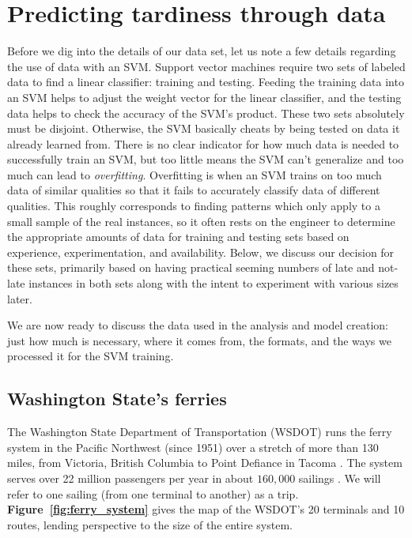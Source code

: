 \documentclass[11pt]{article} %
\begin{document}
\section{Predicting tardiness through data}
\label{sec:problem}
Before we dig into the details of our data set, let us note a few details regarding
the use of data with an SVM.  Support vector machines require two sets of labeled 
data to find a linear classifier:
training and testing. Feeding the training data into an SVM helps to adjust 
the weight vector for the linear classifier, and the testing data helps 
to check the accuracy of the SVM's product.  These two sets absolutely must 
be disjoint. Otherwise, the SVM basically cheats by being
tested on data it already learned from. There is no clear indicator for how much data
is needed to successfully train an SVM, but too little means the SVM can't 
generalize and too much can lead to \textit{overfitting}. Overfitting is when an 
SVM trains on too much data of similar qualities so that it fails to accurately
classify data of different qualities. This roughly corresponds to finding patterns
which only apply to a small sample of the real instances, so it often rests 
on the engineer to determine the appropriate amounts of data for training
and testing sets based on experience, experimentation, and availability. Below,
we discuss our decision for these sets, primarily based on having practical
seeming numbers of late and not-late instances in both sets along with the intent
to experiment with various sizes later.

We are now ready to discuss the data used in the analysis and model creation: 
just how much is necessary, where it comes from, the formats, and the ways we
processed it for the SVM training.


\subsection{Washington State's ferries}
\label{sec:wsdot}
The Washington State Department of Transportation (WSDOT) runs the ferry system
in the Pacific Northwest (since 1951) over a stretch of more than 130 miles, from 
Victoria, British Columbia to Point Defiance in Tacoma \cite{wsdotFleet}. The system 
serves over 22 million passengers per year in about $160,000$ sailings 
\cite{wsfTraffic}.  We will refer to one sailing (from one terminal to another) as a 
trip.  \textbf{Figure~\ref{fig:ferry_system}} gives the map of the WSDOT's 20 
terminals and 10 routes, lending perspective to the size of the entire system.
\end{document}
